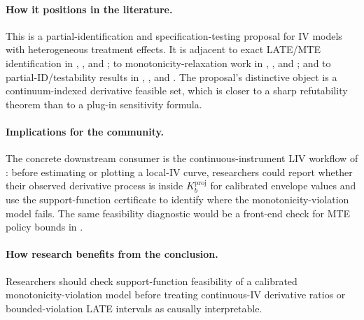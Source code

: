 \documentclass[11pt]{article}
\theoremstyle{definition}
\theoremstyle{plain}
\theoremstyle{remark}
\begin{document}
\paragraph{How it positions in the literature.}
This is a partial-identification and specification-testing proposal for IV models with heterogeneous treatment effects.  It is adjacent to exact LATE/MTE identification in \citet{ImbensAngrist1994}, \citet{Vytlacil2002}, and \citet{HeckmanVytlacil2005}; to monotonicity-relaxation work in \citet{Klein2010}, \citet{DeChaisemartin2017}, and \citet{MogstadTorgovitskyWalters2021}; and to partial-ID/testability results in \citet{BalkePearl1997}, \citet{Kitagawa2015}, and \citet{MogstadSantosTorgovitsky2018}.  The proposal's distinctive object is a continuum-indexed derivative feasible set, which is closer to a sharp refutability theorem than to a plug-in sensitivity formula.

\paragraph{Implications for the community.}
The concrete downstream consumer is the continuous-instrument LIV workflow of \citet{KennedyLorchSmall2019}: before estimating or plotting a local-IV curve, researchers could report whether their observed derivative process is inside \(K_b^{\mathrm{proj}}\) for calibrated envelope values and use the support-function certificate to identify where the monotonicity-violation model fails.  The same feasibility diagnostic would be a front-end check for MTE policy bounds in \citet{MogstadSantosTorgovitsky2018}.

\paragraph{How research benefits from the conclusion.}
Researchers should check support-function feasibility of a calibrated monotonicity-violation model before treating continuous-IV derivative ratios or bounded-violation LATE intervals as causally interpretable.
\end{document}
